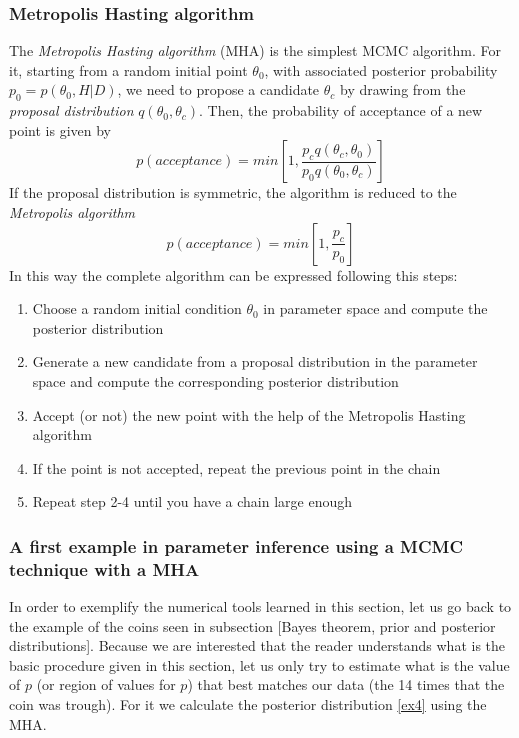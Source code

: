 \documentclass[onecolumn,           %
               showpacs,            %
               preprintnumbers,     %
               aps,                 %
               prl,          	    %
               letterpaper,             %
               superscriptaddress,      %
               nofootinbib,         %
               tightenlines,        %
               floats,floatfix      %
               ,usenatbib,
               ]{revtex4-1}
\begin{document}
\subsubsection{Metropolis Hasting algorithm}

The \textit{Metropolis Hasting algorithm} (MHA) \cite{metr} is the simplest MCMC algorithm. For it, starting from a random initial point $\theta_0$, with associated posterior probability $p_0=p(\theta_0,H|D)$, we need to propose a candidate $\theta_c$ by drawing from the \textit{proposal distribution} $q(\theta_0,\theta_c)$. Then, the probability of acceptance of a new point is given by
\begin{equation}
p(acceptance)=min\left[1,\frac{p_cq(\theta_c,\theta_0)}{p_0q(\theta_0,\theta_c)}\right]
\end{equation}
If the proposal distribution is symmetric, the algorithm is reduced to the \textit{Metropolis algorithm}
\begin{equation}
p(acceptance)=min\left[1,\frac{p_c}{p_0}\right]
\end{equation}
In this way the complete algorithm can be expressed following this steps:
\begin{enumerate}
\item Choose a random initial condition $\theta_0$ in parameter space and compute the posterior distribution
\item Generate a new candidate from a proposal distribution in the parameter space and compute the corresponding posterior distribution
\item Accept (or not) the new point with the help of the Metropolis Hasting algorithm
\item If the point is not accepted, repeat the previous point in the chain
\item Repeat step 2-4 until you have a chain large enough
\end{enumerate}

\subsubsection{A first example in parameter inference using a MCMC technique with a MHA}

In order to exemplify the numerical tools learned in this section, let us 
go back to the example of the coins seen in subsection [Bayes theorem, prior and posterior distributions]. Because we are interested that the reader understands what is the basic procedure given in this section, let us only try to estimate what is the value of $p$ (or region of values for $p$) that best matches our data (the 14 times that the coin was trough). For it we calculate the posterior distribution \eqref{ex4} using the MHA. 
\end{document}
